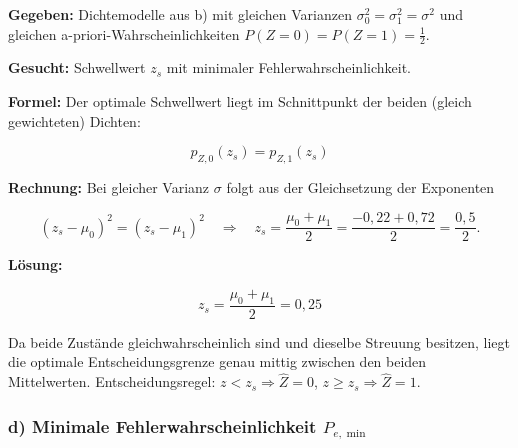 \begin{beispiel}

\textbf{Gegeben:} Dichtemodelle aus b) mit gleichen Varianzen
$\sigma_0^2 = \sigma_1^2 = \sigma^2$ und gleichen a-priori-Wahrscheinlichkeiten
$P(Z=0) = P(Z=1) = \tfrac12$.

\textbf{Gesucht:} Schwellwert $z_s$ mit minimaler Fehlerwahrscheinlichkeit.

\textbf{Formel:} Der optimale Schwellwert liegt im Schnittpunkt der beiden
(gleich gewichteten) Dichten:

$$
p_{Z,0}(z_s) = p_{Z,1}(z_s)
$$

\textbf{Rechnung:} Bei gleicher Varianz $\sigma$ folgt aus der Gleichsetzung der
Exponenten

$$
(z_s - \mu_0)^2 = (z_s - \mu_1)^2
\quad\Longrightarrow\quad
z_s = \frac{\mu_0 + \mu_1}{2}
= \frac{-0{,}22 + 0{,}72}{2} = \frac{0{,}5}{2}.
$$

\textbf{Lösung:}

$$
\boxed{\;z_s = \frac{\mu_0 + \mu_1}{2} = 0{,}25\;}
$$

Da beide Zustände gleichwahrscheinlich sind und dieselbe Streuung besitzen,
liegt die optimale Entscheidungsgrenze genau mittig zwischen den beiden
Mittelwerten. Entscheidungsregel: $z < z_s \Rightarrow \hat{Z} = 0$,
$z \geq z_s \Rightarrow \hat{Z} = 1$.

\end{beispiel}

\subsubsection*{d) Minimale Fehlerwahrscheinlichkeit $P_{e,\min}$}


